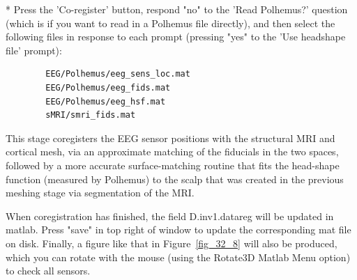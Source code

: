 * Press the 'Co-register' button, respond "no" to the 'Read Polhemus?' question (which is if you want to read in a Polhemus file directly), and then select the following files in response to each prompt (pressing "yes" to the 'Use headshape file' prompt):
\begin{verbatim}
  		EEG/Polhemus/eeg_sens_loc.mat
   		EEG/Polhemus/eeg_fids.mat
   		EEG/Polhemus/eeg_hsf.mat
   		sMRI/smri_fids.mat
\end{verbatim}
This stage coregisters the EEG sensor positions with the structural MRI and cortical mesh, via an approximate matching of the fiducials in the two spaces, followed by a more accurate surface-matching routine that fits the head-shape function (measured by Polhemus) to the scalp that was created in the previous meshing stage via segmentation of the MRI.

When coregistration has finished, the field D.inv{1}.datareg will be updated in matlab. Press "save" in top right of window to update the corresponding mat file on disk. Finally, a figure like that in Figure~\ref{fig_32_8} will also be produced, which you can rotate with the mouse (using the Rotate3D Matlab Menu option) to check all sensors.


